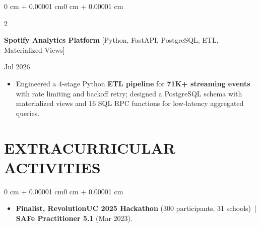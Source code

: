 \documentclass[10pt, letterpaper]{article}
\newenvironment{highlights}{
    \begin{itemize}[
        topsep=0.10 cm,
        parsep=0.06 cm,
        partopsep=0pt,
        itemsep=0.06 cm,
        leftmargin=12pt
    ]
}{
    \end{itemize}
}
\newenvironment{onecolentry}{
    \begin{adjustwidth}{0 cm + 0.00001 cm}{0 cm + 0.00001 cm}
}{
    \end{adjustwidth}
}
\newenvironment{twocolentry}[2][]{
    \onecolentry
    \def\secondColumn{#2}
    \setcolumnwidth{\fill, 4.5 cm}
    \begin{paracol}{2}
}{
    \switchcolumn \raggedleft \secondColumn
    \end{paracol}
    \endonecolentry
}
\begin{document}
\vspace{0.12 cm}

\begin{twocolentry}{Jul 2026}
\textbf{Spotify Analytics Platform} [Python, FastAPI, PostgreSQL, ETL, Materialized Views]
\end{twocolentry}
\begin{highlights}
  \item Engineered a 4-stage Python \textbf{ETL pipeline} for \textbf{71K+ streaming events} with rate limiting and backoff retry; designed a PostgreSQL schema with materialized views and 16 SQL RPC functions for low-latency aggregated queries.
\end{highlights}

\section{EXTRACURRICULAR ACTIVITIES}
\begin{onecolentry}
\begin{highlights}
  \item \textbf{Finalist, RevolutionUC 2025 Hackathon} (300 participants, 31 schools) \,|\, \textbf{SAFe Practitioner 5.1} (Mar 2023).
\end{highlights}
\end{onecolentry}
\end{document}
